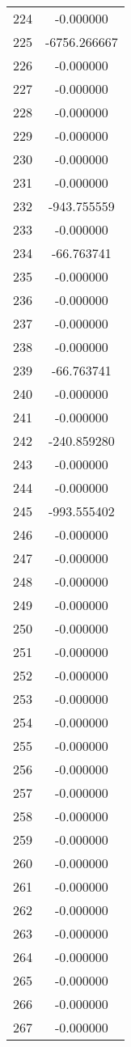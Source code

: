 \documentclass[12pt]{article}
\begin{document}
\begin{longtable}{@{}cc@{}}
224 & -0.000000 \\
225 & -6756.266667 \\
226 & -0.000000 \\
227 & -0.000000 \\
228 & -0.000000 \\
229 & -0.000000 \\
230 & -0.000000 \\
231 & -0.000000 \\
232 & -943.755559 \\
233 & -0.000000 \\
234 & -66.763741 \\
235 & -0.000000 \\
236 & -0.000000 \\
237 & -0.000000 \\
238 & -0.000000 \\
239 & -66.763741 \\
240 & -0.000000 \\
241 & -0.000000 \\
242 & -240.859280 \\
243 & -0.000000 \\
244 & -0.000000 \\
245 & -993.555402 \\
246 & -0.000000 \\
247 & -0.000000 \\
248 & -0.000000 \\
249 & -0.000000 \\
250 & -0.000000 \\
251 & -0.000000 \\
252 & -0.000000 \\
253 & -0.000000 \\
254 & -0.000000 \\
255 & -0.000000 \\
256 & -0.000000 \\
257 & -0.000000 \\
258 & -0.000000 \\
259 & -0.000000 \\
260 & -0.000000 \\
261 & -0.000000 \\
262 & -0.000000 \\
263 & -0.000000 \\
264 & -0.000000 \\
265 & -0.000000 \\
266 & -0.000000 \\
267 & -0.000000 \\

\end{longtable}
\end{document}
